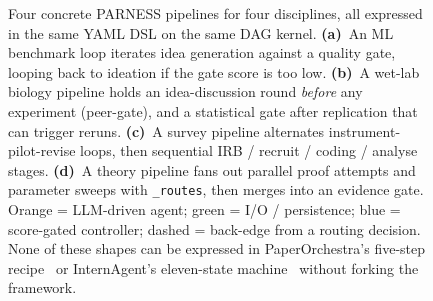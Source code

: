 \documentclass{article}
\newcommand{\parness}{\textsf{PARNESS}}
\newcommand{\code}[1]{\texttt{\small #1}}
\begin{document}
\begin{figure}[t]
\caption{Four concrete \parness{} pipelines for four disciplines, all
expressed in the same YAML DSL on the same DAG kernel.
\textbf{(a)}~An ML benchmark loop iterates idea generation against a
quality gate, looping back to ideation if the gate score is too low.
\textbf{(b)}~A wet-lab biology pipeline holds an idea-discussion round
\emph{before} any experiment (peer-gate), and a statistical gate after
replication that can trigger reruns.
\textbf{(c)}~A survey pipeline alternates instrument-pilot-revise
loops, then sequential IRB / recruit / coding / analyse stages.
\textbf{(d)}~A theory pipeline fans out parallel proof attempts and
parameter sweeps with \code{\_routes}, then merges into an evidence
gate. Orange = LLM-driven agent; green = I/O / persistence; blue =
score-gated controller; dashed = back-edge from a routing decision.
None of these shapes can be expressed in PaperOrchestra's five-step
recipe~\cite{paperorchestra} or InternAgent's eleven-state
machine~\cite{internagent} without forking the framework.}
\label{fig:workflows}
\end{figure}
\end{document}
